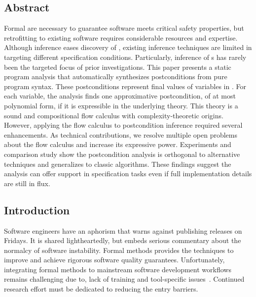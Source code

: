 \subsection*{Abstract}

Formal  are necessary to guarantee software meets critical
safety properties, but retrofitting  to existing software
requires considerable resources and expertise. Although inference eases
discovery of , existing inference techniques are limited in
targeting different specification conditions. Particularly, inference of
s has rarely been the targeted focus of prior investigations.
This paper presents a static program analysis that automatically synthesizes
postconditions from pure program syntax. These postconditions represent final
values of variables in . For each variable, the analysis
finds one approximative postcondition, of at most polynomial form, if it is
expressible in the underlying theory. This theory is a sound and compositional
flow calculus with complexity-theoretic origins. However, applying the flow
calculus to postcondition inference required several enhancements. As technical
contributions, we resolve multiple open problems about the flow calculus and
increase its expressive power. Experiments and comparison study show the
postcondition analysis is orthogonal to alternative techniques and generalizes
to classic algorithms. These findings suggest the  analysis
can offer support in specification tasks even if full implementation details are
still in flux.

\subsection{Introduction}
\label{sec:pc-intro}

Software engineers have an aphorism that warns against publishing releases on
Fridays. It is shared lightheartedly, but embeds serious commentary about the
normalcy of software instability. Formal methods provides the techniques to
improve and achieve rigorous software quality guarantees. Unfortunately,
integrating formal methods to mainstream software development workflows remains
challenging due to, \eg lack of training and tool-specific
issues~\cite{beek2024}. Continued research effort must be dedicated to reducing
the entry barriers.


